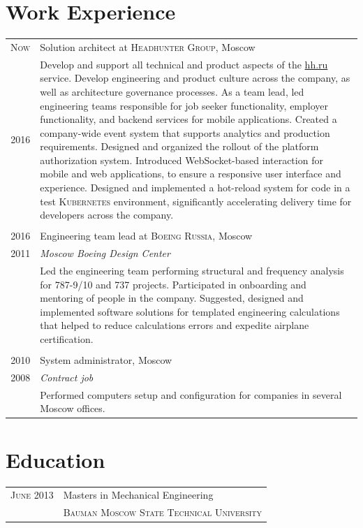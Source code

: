 \documentclass[a4paper,10pt]{article}
\begin{document}
\section{Work Experience}
\begin{tabular}{r|p{11cm}}

  \textsc{Now} & Solution architect at \textsc{Headhunter Group}, Moscow \\
  \textsc{2016}
  & \footnotesize{
      Develop and support all technical and product aspects of the \href{https://hh.ru}{hh.ru} service.\newline
      Develop engineering and product culture across the company, as well as architecture governance processes.\newline
      As a team lead, led engineering teams responsible for job seeker functionality, employer functionality, and backend services for mobile applications.\newline
      Created a company-wide event system that supports analytics and production requirements.\newline
      Designed and organized the rollout of the platform authorization system.\newline
      Introduced WebSocket-based interaction for mobile and web applications, to ensure a responsive user interface and experience.\newline
      Designed and implemented a hot-reload system for code in a test \textsc{Kubernetes} environment, significantly accelerating delivery time for developers across the company.\newline
  } \\\multicolumn{2}{c}{} \\

  \textsc{2016} & Engineering team lead at \textsc{Boeing Russia}, Moscow \\
  \textsc{2011} & \emph{Moscow Boeing Design Center} \\
  & \footnotesize{
      Led the engineering team performing structural and frequency analysis for 787-9/10 and 737 projects. Participated in onboarding and mentoring of people in the company.\newline
      Suggested, designed and implemented software solutions for templated engineering calculations that helped to reduce calculations errors and expedite airplane certification.
  } \\\multicolumn{2}{c}{} \\

  \textsc{2010} & System administrator, Moscow \\
  \textsc{2008} & \emph{Contract job} \\
  & \footnotesize{
      Performed computers setup and configuration for companies in several Moscow offices.
  }
\end{tabular}

\section{Education}
\begin{tabular}{r|p{11cm}}
  \textsc{June 2013} & Masters in Mechanical Engineering \\ & \textsc{Bauman Moscow State Technical University} \\
\end{tabular}
\end{document}
